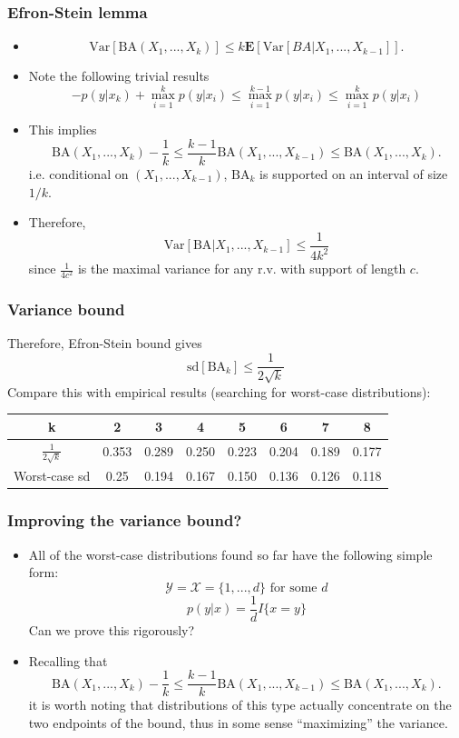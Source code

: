 \documentclass{beamer}
\newcommand{\E}{\textbf{E}}
\begin{document}
\begin{frame}
\frametitle{Efron-Stein lemma}
\begin{itemize}
\item 
\[
\text{Var}[\text{BA}(X_1,...,X_k)] \leq k \E[\text{Var}[BA|X_1,...,X_{k-1}]].
\]
\item Note the following trivial results
\[
-p(y|x_k) + \max_{i=1}^k p(y|x_i)\leq \max_{i=1}^{k-1} p(y|x_i) \leq \max_{i=1}^k p(y|x_i)
\]
\item This implies
\[
\text{BA}(X_1,...,X_k) - \frac{1}{k} \leq \frac{k-1}{k}\text{BA}(X_1,...,X_{k-1}) \leq \text{BA}(X_1,...,X_k).
\]
i.e. conditional on $(X_1,...,X_{k-1})$, $\text{BA}_k$ is supported on an interval of size $1/k$.
\item Therefore,
\[
\text{Var}[\text{BA}|X_1,...,X_{k-1}] \leq \frac{1}{4k^2}
\]
since $\frac{1}{4c^2}$ is the maximal variance for any r.v. with support of length $c$.
\end{itemize}
\end{frame}

\begin{frame}
\frametitle{Variance bound}
Therefore, Efron-Stein bound gives
\[
\text{sd}[\text{BA}_k] \leq \frac{1}{2\sqrt{k}}
\]
Compare this with empirical results (searching for worst-case distributions):
\begin{tabular}{c||c|c|c|c|c|c|c}
k & 2 & 3 & 4 & 5 & 6 & 7 & 8\\\hline
$\frac{1}{2\sqrt{k}}$ & 0.353 & 0.289 & 0.250 & 0.223 & 0.204 & 0.189 & 0.177\\\hline
Worst-case sd & 0.25 & 0.194 & 0.167 & 0.150 & 0.136 & 0.126 & 0.118
\end{tabular}
\end{frame}

\begin{frame}
\frametitle{Improving the variance bound?}
\begin{itemize}
\item All of the worst-case distributions found so far have the
  following simple form:
\[
\mathcal{Y} = \mathcal{X} = \{1,...,d\} \text{ for some } d
\]
\[
p(y|x) = \frac{1}{d}I\{x = y\}
\]
Can we prove this rigorously?
\item Recalling that
\[
\text{BA}(X_1,...,X_k) - \frac{1}{k} \leq \frac{k-1}{k}\text{BA}(X_1,...,X_{k-1}) \leq \text{BA}(X_1,...,X_k).
\]
it is worth noting that distributions of this type actually
concentrate on the two endpoints of the bound, thus in some sense
``maximizing'' the variance.
\end{itemize}
\end{frame}
\end{document}

